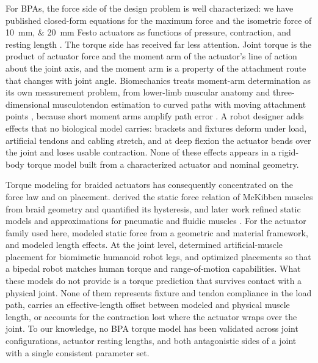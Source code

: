 \documentclass[utf8]{FrontiersinHarvard} %
\begin{document}
For BPAs, the force side of the design problem is well characterized: we have published closed-form equations for the maximum force and the isometric force of \qtylist{10;20}{\mm} Festo actuators as functions of pressure, contraction, and resting length \citep{bolen_2026}. The torque side has received far less attention. Joint torque is the product of actuator force and the moment arm of the actuator's line of action about the joint axis, and the moment arm is a property of the attachment route that changes with joint angle. Biomechanics treats moment-arm determination as its own measurement problem, from lower-limb muscular anatomy \citep{brand_model_1982} and three-dimensional musculotendon estimation \citep{menegaldo_moment_2004} to curved paths with moving attachment points \citep{suderman_moving_2012}, because short moment arms amplify path error \citep{young_analyzing_2019}. A robot designer adds effects that no biological model carries: brackets and fixtures deform under load, artificial tendons and cabling stretch, and at deep flexion the actuator bends over the joint and loses usable contraction. None of these effects appears in a rigid-body torque model built from a characterized actuator and nominal geometry.

Torque modeling for braided actuators has consequently concentrated on the force law and on placement. \citet{chou_measurement_1996} derived the static force relation of McKibben muscles from braid geometry and quantified its hysteresis, and later work refined static models and approximations for pneumatic and fluidic muscles \citep{tondu_static_2022, sarosi_new_2012}. For the actuator family used here, \citet{martens_modeling_2017} modeled static force from a geometric and material framework, and \citet{hunt_modeling_2017} modeled length effects. At the joint level, \citet{bolen_determination_2019} determined artificial-muscle placement for biomimetic humanoid robot legs, and \citet{morrow_optimization_2020} optimized placements so that a bipedal robot matches human torque and range-of-motion capabilities. What these models do not provide is a torque prediction that survives contact with a physical joint. None of them represents fixture and tendon compliance in the load path, carries an effective-length offset between modeled and physical muscle length, or accounts for the contraction lost where the actuator wraps over the joint. To our knowledge, no BPA torque model has been validated across joint configurations, actuator resting lengths, and both antagonistic sides of a joint with a single consistent parameter set.
\end{document}
